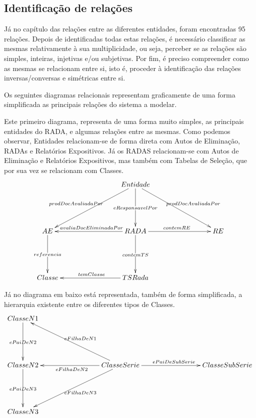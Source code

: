\documentclass{article}
\begin{document}
\subsection{Identificação de relações}

\par Já no capítulo das relações entre as diferentes entidades, foram encontradas 95 relações. Depois de identificadas todas estas relações, é necessário classificar as mesmas relativamente à sua multiplicidade, ou seja, perceber se as relações são simples, inteiras, injetivas e/ou subjetivas. Por fim, é preciso compreender como as mesmas se relacionam entre si, isto é, proceder à identificação das relações inversas/conversas e simétricas entre si.

\par Os seguintes diagramas relacionais representam graficamente de uma forma simplificada as principais relações do sistema a modelar.
\par Este primeiro diagrama, representa de uma forma muito simples, as principais entidades do RADA, e algumas relações entre as mesmas. Como podemos observar, Entidades relacionam-se de forma direta com Autos de Eliminação, RADAs e Relatórios Expositivos. Já os RADAS relacionam-se com Autos de Eliminação e Relatórios Expositivos, mas também com Tabelas de Seleção, que por sua vez se relacionam com Classes.
\begin{equation}
    \xymatrix{
    & & & Entidade \ar[dd]|{eResponsavelPor} \ar[ddlll]_{prodDocAvaliadaPor} \ar[ddrrr]^{prodDocAvaliadaPor} \\ \\
    AE \ar[dd]|{referencia} & & & RADA \ar[lll]_{avaliaDocEliminadaPor}  \ar[dd]|{contemTS} \ar[rrr]^{contemRE} & & & RE \\ \\
    Classe & & & TSRada \ar[lll]_{temClasse} \\
    }
\end{equation}

\par Já no diagrama em baixo está representada, também de forma simplificada, a hierarquia existente entre os diferentes tipos de Classes. 
\begin{equation}
    \xymatrix{
        ClasseN1 \ar[dd]|{ePaiDeN2} \\ \\
        ClasseN2 \ar[dd]|{ePaiDeN3} & & &
            ClasseSerie \ar[uulll]_{eFilhaDeN1}
                        \ar[lll]^{eFilhaDeN2}
                        \ar[ddlll]^{eFilhaDeN3}
                        \ar[rrr]^{ePaiDeSubSerie}  & & & ClasseSubSerie\\ \\
        ClasseN3
    }
\end{equation}
\end{document}
